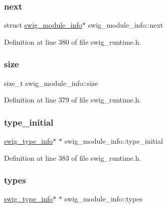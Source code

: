 \subsubsection{\texorpdfstring{next}{next}}
{\footnotesize\ttfamily struct \mbox{\hyperlink{structswig__module__info}{swig\+\_\+module\+\_\+info}}$\ast$ swig\+\_\+module\+\_\+info\+::next}



Definition at line 380 of file swig\+\_\+runtime.\+h.

\mbox{\label{structswig__module__info_aaf8907cf8509ee0464af8c9dfd909042}} 
\subsubsection{\texorpdfstring{size}{size}}
{\footnotesize\ttfamily size\+\_\+t swig\+\_\+module\+\_\+info\+::size}



Definition at line 379 of file swig\+\_\+runtime.\+h.

\mbox{\label{structswig__module__info_af5e826d0f0c1698f7404543a7d5b258a}} 
\subsubsection{\texorpdfstring{type\+\_\+initial}{type\_initial}}
{\footnotesize\ttfamily \mbox{\hyperlink{structswig__type__info}{swig\+\_\+type\+\_\+info}}$\ast$ $\ast$ swig\+\_\+module\+\_\+info\+::type\+\_\+initial}



Definition at line 383 of file swig\+\_\+runtime.\+h.

\mbox{\label{structswig__module__info_abda310ff2462f8a1ebfc8dc7552206f2}} 
\subsubsection{\texorpdfstring{types}{types}}
{\footnotesize\ttfamily \mbox{\hyperlink{structswig__type__info}{swig\+\_\+type\+\_\+info}}$\ast$ $\ast$ swig\+\_\+module\+\_\+info\+::types}



